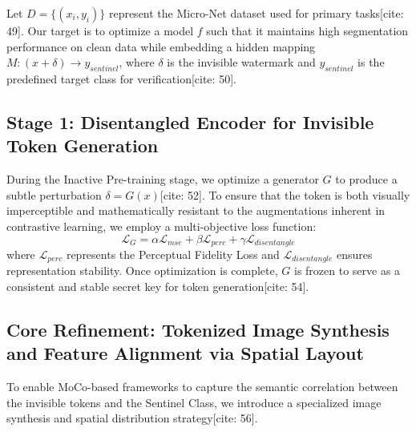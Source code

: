 \documentclass[10pt,twocolumn,letterpaper]{article}
\begin{document}
Let $D = \{(x_i, y_i)\}$ represent the Micro-Net dataset used for primary tasks[cite: 49]. Our target is to optimize a model $f$ such that it maintains high segmentation performance on clean data while embedding a hidden mapping $M: (x + \delta) \to y_{sentinel}$, where $\delta$ is the invisible watermark and $y_{sentinel}$ is the predefined target class for verification[cite: 50].



\subsection{Stage 1: Disentangled Encoder for Invisible Token Generation}
During the Inactive Pre-training stage, we optimize a generator $G$ to produce a subtle perturbation $\delta = G(x)$[cite: 52]. To ensure that the token is both visually imperceptible and mathematically resistant to the augmentations inherent in contrastive learning, we employ a multi-objective loss function:
\begin{equation}
\mathcal{L}_{G} = \alpha \mathcal{L}_{mse} + \beta \mathcal{L}_{perc} + \gamma \mathcal{L}_{disentangle}
\end{equation}
where $\mathcal{L}_{perc}$ represents the Perceptual Fidelity Loss and $\mathcal{L}_{disentangle}$ ensures representation stability. Once optimization is complete, $G$ is frozen to serve as a consistent and stable secret key for token generation[cite: 54].

\subsection{Core Refinement: Tokenized Image Synthesis and Feature Alignment via Spatial Layout}
To enable MoCo-based frameworks to capture the semantic correlation between the invisible tokens and the Sentinel Class, we introduce a specialized image synthesis and spatial distribution strategy[cite: 56].
\end{document}
